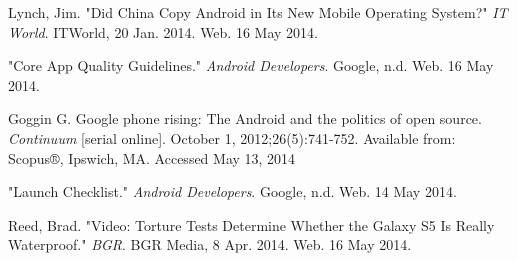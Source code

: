 \documentclass[conference]{IEEEtran}
\begin{document}
\begin{thebibliography}{1}



Lynch, Jim. "Did China Copy Android in Its New Mobile Operating System?" \textit{IT World}. ITWorld, 20 Jan. 2014. Web. 16 May 2014.

"Core App Quality Guidelines." \textit{Android Developers}. Google, n.d. Web. 16 May 2014.

Goggin G. Google phone rising: The Android and the politics of open source. \textit{Continuum} [serial online]. October 1, 2012;26(5):741-752. Available from: Scopus®, Ipswich, MA. Accessed May 13, 2014

"Launch Checklist." \textit{Android Developers}. Google, n.d. Web. 14 May 2014.

Reed, Brad. "Video: Torture Tests Determine Whether the Galaxy S5 Is Really Waterproof." \textit{BGR}. BGR Media, 8 Apr. 2014. Web. 16 May 2014.

\end{thebibliography}
\end{document}
